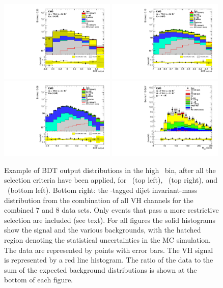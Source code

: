 \documentclass[12pt,twoside,a4paper,cmspaper,final,collab]{cms-tdr}
\begin{document}
\begin{figure}[tbp]
  \begin{center}
    \includegraphics[width=0.49\textwidth]{figures/hbb_Zmm_HighPt_PostFit_s_7TeV.pdf}
    \includegraphics[width=0.49\textwidth]{figures/hbb_Znn_HighPt_PostFit_s_7TeV.pdf}
    \includegraphics[width=0.49\textwidth]{figures/hbb_Wen_HighPt_PostFit_s_8TeV.pdf}
    \includegraphics[width=0.49\textwidth]{figures/hbb_Mbb.pdf}
    \caption{Example of BDT output distributions in the
    high \ptV\ bin, after all the selection criteria have been applied, for \ZmmH\ (top left),
       \ZnnH\ (top right), and \WenH\ (bottom left). Bottom right: the
       \cPqb-tagged dijet invariant-mass distribution from the combination of all
  VH channels for the combined  7 and 8\TeV
  data sets. Only events that pass
    a more restrictive selection are included (see text). For all figures the solid
    histograms show the signal and the various
      backgrounds, with the hatched region denoting the statistical
    uncertainties in the MC simulation. The data are represented by points
      with error bars. The VH signal is represented by a red line
      histogram. The ratio of the data to the sum of the
    expected background distributions is shown at the bottom of each
    figure.}
    \label{fig:Hbb_figs}
  \end{center}
\end{figure}
\end{document}
